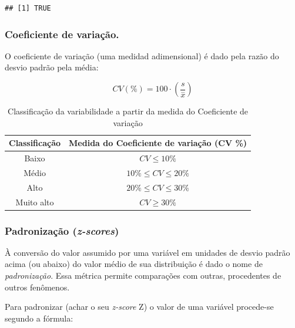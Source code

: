 \documentclass[
]{book}
\begin{document}
\begin{verbatim}
## [1] TRUE
\end{verbatim}

\hypertarget{coeficiente-de-variauxe7uxe3o.}{%
\subsubsection{Coeficiente de variação.}\label{coeficiente-de-variauxe7uxe3o.}}

\hfill\break

O coeficiente de variação (uma medidad adimensional) é dado pela razão do desvio padrão pela média:

\hfill\break

\[
CV(\%)= 100\cdot(\frac{s}{\stackrel{-}{x}})
\]

\hfill\break

\begin{table}[h]
\centering
\caption{Classificação da variabilidade a partir da medida do Coeficiente de variação}
\begin{tabular}{|c|c|}
\hline 
Classificação  & Medida do Coeficiente de variação (CV \%) \\ 
\hline 
Baixo & $CV \le 10\%$ \\
\hline 
Médio  & $10\% \le CV \le 20\%$ \\
\hline 
Alto  & $20\% \le CV \le 30\%$ \\
\hline 
Muito alto & $CV \ge 30\%$ \\
\hline 
\end{tabular}
\end{table}

\hfill\break

\hypertarget{padronizauxe7uxe3o-z-scores}{%
\subsubsection{\texorpdfstring{Padronização (\emph{z-scores})}{Padronização (z-scores)}}\label{padronizauxe7uxe3o-z-scores}}

\hfill\break

À conversão do valor assumido por uma variável em unidades de desvio padrão acima (ou abaixo) do valor médio de sua distribuição é dado o nome de \emph{padronização}. Essa métrica permite comparações com outras, procedentes de outros fenômenos.

\hfill\break

Para padronizar (achar o seu \emph{z-score} Z) o valor de uma variável procede-se segundo a fórmula:
\end{document}
